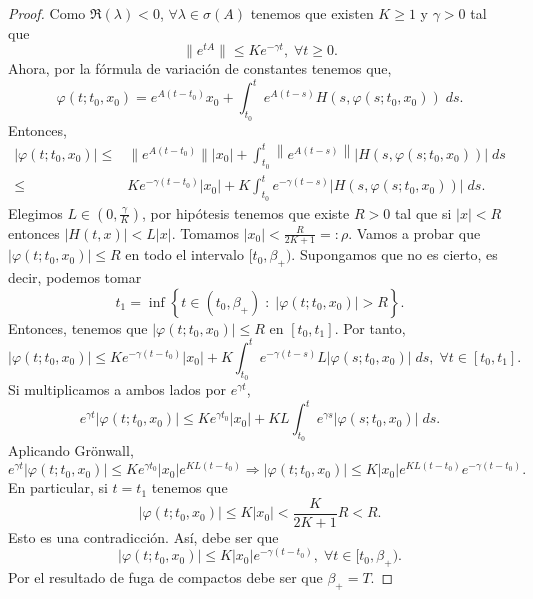 \begin{proof}
Como $\displaystyle \Re\left(\lambda \right)< 0 $, $\displaystyle \forall \lambda \in \sigma\left(A\right) $ tenemos que existen $\displaystyle K \geq 1 $ y $\displaystyle \gamma > 0 $ tal que 
\[\|e^{tA}\| \leq Ke^{-\gamma t}, \; \forall t \geq 0 .\]
Ahora, por la fórmula de variación de constantes tenemos que, 
\[\varphi\left(t; t_{0}, x_{0}\right)=e^{A\left(t-t_{0}\right)}x_{0} + \int^{t}_{t_{0}} e^{A\left(t-s\right)}H\left(s, \varphi\left(s; t_{0}, x_{0}\right)\right) \; d s .\]
Entonces, 
\[
\begin{split}
	|\varphi\left(t; t_{0}, x_{0}\right)| \leq & \|e^{A\left(t-t_{0}\right)}\| |x_{0}| + \int^{t}_{t_{0}} \left\|e^{A\left(t-s\right)}\right\| |H\left(s, \varphi\left(s; t_{0}, x_{0}\right)\right)| \; d s \\
	\leq & Ke^{-\gamma\left(t-t_{0}\right)}|x_{0}| + K\int^{t}_{t_{0}} e^{-\gamma \left(t-s\right)} |H\left(s, \varphi\left(s; t_{0}, x_{0}\right)\right)| \; d s .
\end{split}
\]
Elegimos $\displaystyle L \in \left(0, \frac{\gamma }{K}\right) $, por hipótesis tenemos que existe $\displaystyle R > 0  $ tal que si $\displaystyle |x|<R $ entonces $\displaystyle |H\left(t,x\right)| < L|x| $. Tomamos $\displaystyle |x_{0}| <\frac{R}{2K+1}=:\rho $. Vamos a probar que $\displaystyle |\varphi\left(t; t_{0}, x_{0}\right)| \leq R $ en todo el intervalo $\displaystyle [t_{0}, \beta_{+ }) $. Supongamos que no es cierto, es decir, podemos tomar
\[t_{1} = \inf \left\{ t \in \left(t_{0}, \beta_{+ } \right)\; : \; |\varphi\left(t; t_{0}, x_{0}\right)| > R\right\}  .\]
Entonces, tenemos que $\displaystyle |\varphi\left(t; t_{0}, x_{0}\right)| \leq R $ en $\displaystyle \left[t_{0}, t_{1}\right]  $. Por tanto, 
\[|\varphi\left(t; t_{0}, x_{0}\right)| \leq Ke^{-\gamma \left(t-t_{0}\right)}|x_{0}| + K\int^{t}_{t_{0}} e^{-\gamma \left(t-s\right)}L |\varphi\left(s; t_{0}, x_{0}\right)| \; d s, \; \forall t \in \left[t_{0}, t_{1}\right]  .\]
Si multiplicamos a ambos lados por $\displaystyle e^{\gamma t} $, 
\[ e^{\gamma t}|\varphi\left(t; t_{0}, x_{0}\right)| \leq Ke^{\gamma t_{0}} |x_{0}| + KL\int^{t}_{t_{0}} e^{\gamma s}|\varphi\left(s; t_{0}, x_{0}\right)| \; d s  .\]
Aplicando Grönwall, 
\[e^{\gamma t}|\varphi\left(t; t_{0}, x_{0}\right)| \leq Ke^{\gamma t_{0}}|x_{0}| e^{KL\left(t-t_{0}\right)} \Rightarrow |\varphi\left(t; t_{0}, x_{0}\right)| \leq K |x_{0}| e^{KL\left(t-t_{0}\right)}e^{-\gamma\left(t-t_{0}\right)} .\]
En particular, si $\displaystyle t = t_{1} $ tenemos que 
\[|\varphi\left(t; t_{0}, x_{0}\right)| \leq K|x_{0}| < \frac{K}{2K+1}R < R .\]
Esto es una contradicción. Así, debe ser que 
\[|\varphi\left(t; t_{0}, x_{0}\right)| \leq K|x_{0}|e^{-\gamma\left(t-t_{0}\right)}, \; \forall t \in [t_{0}, \beta_{+}) .\]
Por el resultado de fuga de compactos debe ser que $\displaystyle \beta_{+ }= T $. 
\end{proof}
